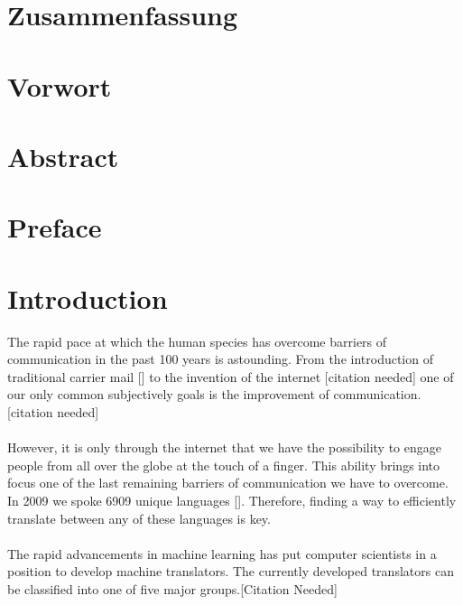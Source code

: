 \documentclass[10pt,a4paper,titlepage,twoside,english]{zhawreprt}
\begin{document}
\maketitle

\chapter*{Zusammenfassung}\label{sec:Abstract}

\chapter*{Vorwort}\label{sec:Vorwort}

\makedeclarationoforiginality

\tableofcontents

\chapter*{Abstract}\label{sec:Abstract}

\chapter*{Preface}\label{sec:Preface}





\chapter{Introduction}\label{chp:Introduction}
The rapid pace at which the human species has overcome barriers of communication in the past 100 years is astounding. From the introduction of traditional carrier mail []  to the invention of the internet [citation needed] one of  our only common subjectively goals is the improvement of communication. [citation needed] 
\\
\\
However, it is only through the internet that we have the possibility to engage people from all over the globe at the touch of a finger. This ability brings into focus one of the last remaining barriers of communication we have to overcome. In 2009 we spoke 6909 unique languages []. Therefore, finding a way to efficiently translate between any of these languages is key.
\\
\\
The rapid advancements in machine learning has put computer scientists in a position to develop machine translators. The currently developed translators can be classified into one of five major groups.[Citation Needed]
\end{document}
